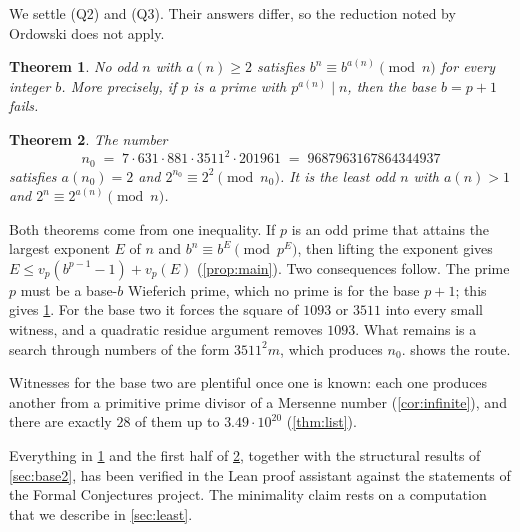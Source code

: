 \documentclass[11pt]{amsart}
\newtheorem{theorem}{Theorem}
\theoremstyle{remark}
\newcommand{\vp}{v_p}
\newcommand{\nO}{n_0}
\begin{document}
We settle (Q2) and (Q3). Their answers differ, so the reduction noted by Ordowski does not
apply.

\begin{theorem}\label{thm:all}
No odd $n$ with $a(n)\ge 2$ satisfies $b^{n}\equiv b^{a(n)}\pmod n$ for every integer $b$.
More precisely, if $p$ is a prime with $p^{a(n)}\mid n$, then the base $b=p+1$ fails.
\end{theorem}

\begin{theorem}\label{thm:least}
The number
\[
\nO \;=\; 7\cdot 631\cdot 881\cdot 3511^{2}\cdot 201961 \;=\; 9687963167864344937
\]
satisfies $a(\nO)=2$ and $2^{\nO}\equiv 2^{2}\pmod{\nO}$. It is the least odd $n$ with
$a(n)>1$ and $2^{n}\equiv 2^{a(n)}\pmod n$.
\end{theorem}

Both theorems come from one inequality. If $p$ is an odd prime that attains the largest
exponent $E$ of $n$ and $b^{n}\equiv b^{E}\pmod{p^{E}}$, then lifting the exponent gives
$E\le\vp(b^{p-1}-1)+\vp(E)$ (\cref{prop:main}). Two consequences follow. The prime $p$ must be a base-$b$
Wieferich prime, which no prime is for the base $p+1$; this gives \cref{thm:all}. For the base
two it forces the square of $1093$ or $3511$ into every small witness, and a quadratic
residue argument removes $1093$. What remains is a search through numbers of the form
$3511^{2}m$, which produces $\nO$.  shows the route.

Witnesses for the base two are plentiful once one is known: each one produces another from
a primitive prime divisor of a Mersenne number (\cref{cor:infinite}), and there are exactly
$28$ of them up to $3.49\cdot 10^{20}$ (\cref{thm:list}).

Everything in \cref{thm:all} and the first half of \cref{thm:least}, together with the
structural results of \cref{sec:base2}, has been verified in the Lean proof assistant
against the statements of the Formal Conjectures project. The minimality claim rests on a
computation that we describe in \cref{sec:least}.
\end{document}
